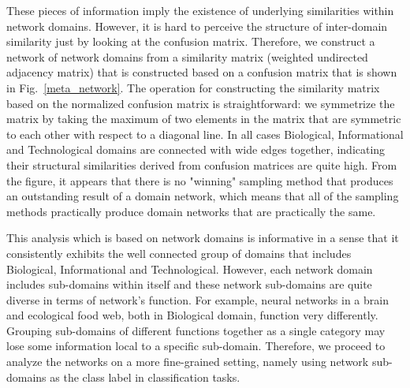 These pieces of information imply the existence of underlying similarities within network domains. However, it is hard to perceive the structure of inter-domain similarity just by looking at the confusion matrix. Therefore, we construct a network of network domains from a similarity matrix (weighted undirected adjacency matrix) that is constructed based on a confusion matrix that is shown in Fig.~\ref{meta_network}. The operation for constructing the similarity matrix based on the normalized confusion matrix is straightforward: we symmetrize the matrix by taking the maximum of two elements in the matrix that are symmetric to each other with respect to a diagonal line. In all cases Biological, Informational and Technological domains are connected with wide edges together, indicating their structural similarities derived from confusion matrices are quite high. From the figure, it appears that there is no "winning" sampling method that produces an outstanding result of a domain network, which means that all of the sampling methods practically produce domain networks that are practically the same.


This analysis which is based on network domains is informative in a sense that it consistently exhibits the well connected group of domains that includes Biological, Informational and Technological. However, each network domain includes sub-domains within itself and these network sub-domains are quite diverse in terms of network's function. For example, neural networks in a brain and ecological food web, both in Biological domain, function very differently. Grouping sub-domains of different functions together as a single category may lose some information local to a specific sub-domain. Therefore, we proceed to analyze the networks on a more fine-grained setting, namely using network sub-domains as the class label in classification tasks.
 

